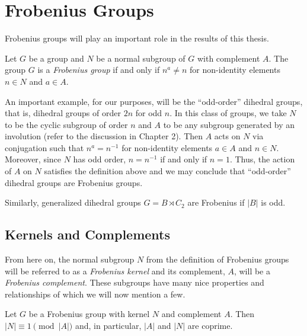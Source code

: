 \documentclass[main.tex]{subfiles}
\begin{document}
\chapter{Frobenius Groups}

Frobenius groups will play an important role in the results of this thesis.

\hss

\begin{definition}
Let $G$ be a group and $N$ be a normal subgroup of $G$ with complement $A$. The group $G$ is a \emph{Frobenius group} if and only if $n^a \ne n$ for non-identity elements $n \in N$ and $a \in A$.
\end{definition}

\hss

An important example, for our purposes, will be the ``odd-order'' dihedral groups, that is, dihedral groups of order $2n$ for odd $n$. In this class of groups, we take $N$ to be the cyclic subgroup of order $n$ and $A$ to be any subgroup generated by an involution (refer to the discussion in Chapter 2). Then $A$ acts on $N$ via conjugation such that $n^a = n^{-1}$ for non-identity elements $a \in A$ and $n \in N$. Moreover, since $N$ has odd order, $n = n^{-1}$ if and only if $n = 1$. Thus, the action of $A$ on $N$ satisfies the definition above and we may conclude that ``odd-order'' dihedral groups are Frobenius groups.

Similarly, generalized dihedral groups $G = B \rtimes C_2$ are Frobenius if $|B|$ is odd.

\hss

\section{Kernels and Complements}

\hss

From here on, the normal subgroup $N$ from the definition of Frobenius groups will be referred to as a \emph{Frobenius kernel} and its complement, $A$, will be a \emph{Frobenius complement}. These subgroups have many nice properties and relationships of which we will now mention a few.

\begin{lemma}\label{frobeniuscoprime}
Let $G$ be a Frobenius group with kernel $N$ and complement $A$. Then $|N| \equiv 1 \pmod{|A|}$ and, in particular, $|A|$ and $|N|$ are coprime.
\end{lemma}
\end{document}
